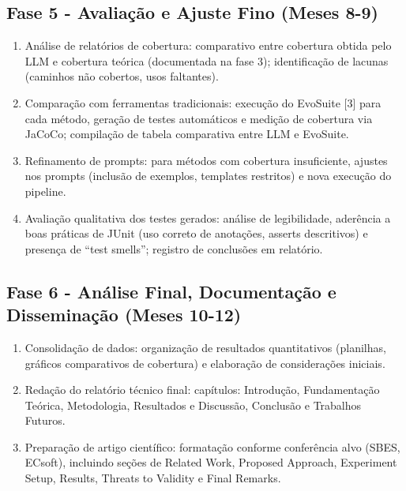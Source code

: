     \subsection{Fase 5 - Avaliação e Ajuste Fino (Meses 8-9)}
        \begin{enumerate}
            \item Análise de relatórios de cobertura: comparativo entre cobertura obtida pelo LLM e cobertura teórica (documentada na fase 3); identificação de lacunas (caminhos não cobertos, usos faltantes).
            \item Comparação com ferramentas tradicionais: execução do EvoSuite [3] para cada método, geração de testes automáticos e medição de cobertura via JaCoCo; compilação de tabela comparativa entre LLM e EvoSuite.
            \item Refinamento de prompts: para métodos com cobertura insuficiente, ajustes nos prompts (inclusão de exemplos, templates restritos) e nova execução do pipeline.
            \item Avaliação qualitativa dos testes gerados: análise de legibilidade, aderência a boas práticas de JUnit (uso correto de anotações, asserts descritivos) e presença de ``test smells''; registro de conclusões em relatório.
        \end{enumerate}
    \subsection{Fase 6 - Análise Final, Documentação e Disseminação (Meses 10-12)}
        \begin{enumerate}
            \item Consolidação de dados: organização de resultados quantitativos (planilhas, gráficos comparativos de cobertura) e elaboração de considerações iniciais.
            \item Redação do relatório técnico final: capítulos: Introdução, Fundamentação Teórica, Metodologia, Resultados e Discussão, Conclusão e Trabalhos Futuros.
            \item Preparação de artigo científico: formatação conforme conferência alvo (SBES, ECsoft), incluindo seções de Related Work, Proposed Approach, Experiment Setup, Results, Threats to Validity e Final Remarks.
        \end{enumerate}